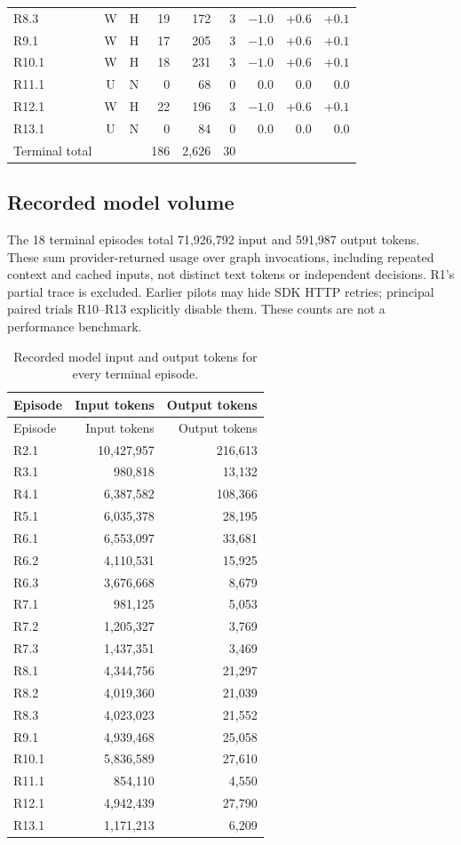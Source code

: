 \begin{longtable}{lccrrr rrr}
R8.3 & W & H & 19 & 172 & 3 & $-1.0$ & $+0.6$ & $+0.1$\\
R9.1 & W & H & 17 & 205 & 3 & $-1.0$ & $+0.6$ & $+0.1$\\
R10.1 & W & H & 18 & 231 & 3 & $-1.0$ & $+0.6$ & $+0.1$\\
R11.1 & U & N & 0 & 68 & 0 & $0.0$ & $0.0$ & $0.0$\\
R12.1 & W & H & 22 & 196 & 3 & $-1.0$ & $+0.6$ & $+0.1$\\
R13.1 & U & N & 0 & 84 & 0 & $0.0$ & $0.0$ & $0.0$\\
\midrule
Terminal total & & & 186 & 2,626 & 30 & & & \\
\bottomrule
\end{longtable}
\endgroup

\subsection{Recorded model volume}
The 18 terminal episodes total 71,926,792 input and 591,987 output tokens.
These sum provider-returned usage over graph invocations, including repeated
context and cached inputs, not distinct text tokens or independent decisions.
R1's partial trace is excluded. Earlier pilots may hide SDK HTTP retries;
principal paired trials R10--R13 explicitly disable them. These counts are
not a performance benchmark.

\begin{longtable}{lrr}
\caption{Recorded model input and output tokens for every terminal episode.}
\label{tab:episode-tokens}\\
\toprule Episode & Input tokens & Output tokens\\\midrule
\endfirsthead
\toprule Episode & Input tokens & Output tokens\\\midrule
\endhead
R2.1 & 10,427,957 & 216,613\\
R3.1 & 980,818 & 13,132\\
R4.1 & 6,387,582 & 108,366\\
R5.1 & 6,035,378 & 28,195\\
R6.1 & 6,553,097 & 33,681\\
R6.2 & 4,110,531 & 15,925\\
R6.3 & 3,676,668 & 8,679\\
R7.1 & 981,125 & 5,053\\
R7.2 & 1,205,327 & 3,769\\
R7.3 & 1,437,351 & 3,469\\
R8.1 & 4,344,756 & 21,297\\
R8.2 & 4,019,360 & 21,039\\
R8.3 & 4,023,023 & 21,552\\
R9.1 & 4,939,468 & 25,058\\
R10.1 & 5,836,589 & 27,610\\
R11.1 & 854,110 & 4,550\\
R12.1 & 4,942,439 & 27,790\\
R13.1 & 1,171,213 & 6,209\\
\bottomrule
\end{longtable}

